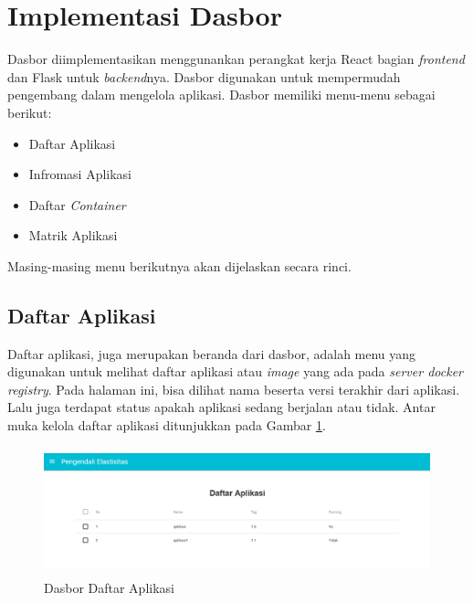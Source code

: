     \section{Implementasi Dasbor}
    	Dasbor diimplementasikan menggunankan perangkat kerja React bagian \textit{frontend} dan Flask untuk \textit{backend}nya. Dasbor digunakan untuk mempermudah pengembang dalam mengelola aplikasi. Dasbor memiliki menu-menu sebagai berikut:
        \begin{itemize}
        \item Daftar Aplikasi
        \item Infromasi Aplikasi
        \item Daftar \textit{Container}
        \item Matrik Aplikasi
        \end{itemize}
        \indent Masing-masing menu berikutnya akan dijelaskan secara rinci.
		\subsection{Daftar Aplikasi}
        	Daftar aplikasi, juga merupakan beranda dari dasbor, adalah menu yang digunakan untuk melihat daftar aplikasi atau \textit{image} yang ada pada \textit{server docker registry}. Pada halaman ini, bisa dilihat nama beserta versi terakhir dari aplikasi. Lalu juga terdapat status apakah aplikasi sedang berjalan atau tidak. Antar muka kelola daftar aplikasi ditunjukkan pada Gambar \ref{ddaftaraplikasi}.
			\begin{figure}[H]
				\centering
				\includegraphics[width=11.2cm,height=3.7cm]{Images/C-4/dasberanda.PNG}
				\caption{Dasbor Daftar Aplikasi}
				\label{ddaftaraplikasi}
			\end{figure}
            
